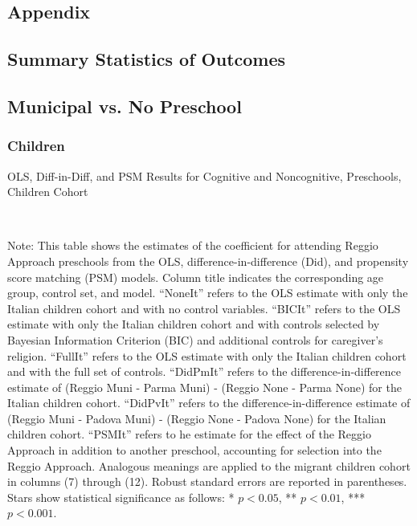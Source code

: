 \begin{landscape}
\section{Appendix}
\subsection{Summary Statistics of Outcomes}

\end{landscape}

\begin{landscape}
\subsection{Municipal vs. No Preschool}\label{appendix:no-preschool}
\subsubsection{Children}
\begin{table}[H] \caption{OLS, Diff-in-Diff, and PSM Results for Cognitive and Noncognitive, Preschools, Children Cohort} \label{ols-E-reg}
\scalebox{0.80}{}
\vspace{1ex} \\
\footnotesize\raggedright{Note: This table shows the estimates of the coefficient for attending Reggio Approach preschools from the OLS, difference-in-difference (Did), and propensity score matching (PSM) models. Column title indicates the corresponding age group, control set, and model. ``NoneIt'' refers to the OLS estimate with only the Italian children cohort and with no control variables. ``BICIt'' refers to the OLS estimate with only the Italian children cohort and with controls selected by Bayesian Information Criterion (BIC) and additional controls for caregiver's religion. ``FullIt'' refers to the OLS estimate with only the Italian children cohort and with the full set of controls. ``DidPmIt'' refers to the difference-in-difference estimate of (Reggio Muni - Parma Muni) - (Reggio None - Parma None) for the Italian children cohort. ``DidPvIt'' refers to the difference-in-difference estimate of (Reggio Muni - Padova Muni) - (Reggio None - Padova None) for the Italian children cohort. ``PSMIt'' refers to he estimate for the effect of the Reggio Approach in addition to another preschool, accounting for selection into the Reggio Approach. Analogous meanings are applied to the migrant children cohort in columns (7) through (12). Robust standard errors are reported in parentheses. Stars show statistical significance as follows: * $p < 0.05$, ** $p < 0.01$, *** $p < 0.001$.}
\end{table}


\end{landscape}
